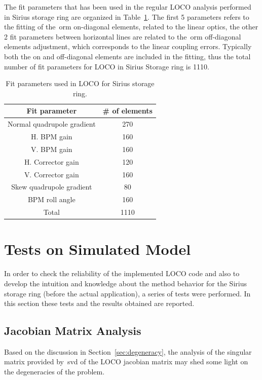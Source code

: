 The fit parameters that has been used in the regular LOCO analysis performed in Sirius storage ring are organized in Table~\ref{tab:fit_params}. The first 5 parameters refers to the fitting of the~\gls{orm} on-diagonal elements, related to the linear optics, the other 2 fit parameters between horizontal lines are related to the~\gls{orm} off-diagonal elements adjustment, which corresponds to the linear coupling errors. Typically both the on and off-diagonal elements are included in the fitting, thus the total number of fit parameters for LOCO in Sirius Storage ring is 1110.
\begin{table}
    \centering
    \caption{Fit parameters used in LOCO for Sirius storage ring.}
    \label{tab:fit_params}
    \begin{tabular}{cc}
        Fit parameter & \# of elements \\
        \toprule\toprule
        Normal quadrupole gradient & 270 \\
        H. BPM gain & 160 \\
        V. BPM gain & 160 \\
        H. Corrector gain & 120 \\
        V. Corrector gain & 160 \\
        \hline
        Skew quadrupole gradient & 80 \\
        BPM roll angle & 160 \\ 
        \hline
        Total & 1110 \\
        \bottomrule\bottomrule
    \end{tabular}
\end{table}

\section{Tests on Simulated Model}
In order to check the reliability of the implemented LOCO code and also to develop the intuition and knowledge about the method behavior for the Sirius storage ring (before the actual application), a series of tests were performed. In this section these tests and the results obtained are reported.
\subsection{Jacobian Matrix Analysis}
Based on the discussion in Section~\ref{sec:degeneracy}, the analysis of the singular matrix provided by~\gls{svd} of the LOCO jacobian matrix may shed some light on the degeneracies of the problem.

